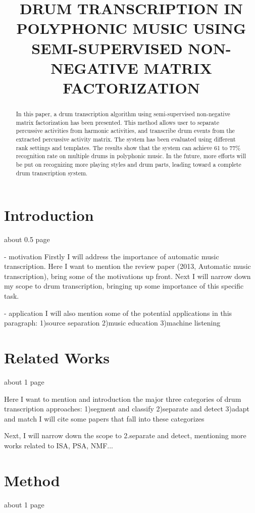 \documentclass{article}
\title{DRUM TRANSCRIPTION IN POLYPHONIC MUSIC USING SEMI-SUPERVISED NON-NEGATIVE MATRIX FACTORIZATION}
\begin{document}
%
\maketitle
%
\begin{abstract}
In this paper, a drum transcription algorithm using semi-supervised non-negative matrix factorization has been presented. This method allows user to separate percussive activities from harmonic activities, and transcribe drum events from the extracted percussive activity matrix. The system has been evaluated using different rank settings and templates. The results show that the system can achieve 61 to 77\% recognition rate on multiple drums in polyphonic music. In the future, more efforts will be put on recognizing more playing styles and drum parts, leading toward a complete drum transcription system.


\end{abstract}
%
\section{Introduction}\label{sec:introduction}
about 0.5 page

- motivation
Firstly I will address the importance of automatic music transcription. Here I want to mention the review paper (2013, Automatic music transcription), bring some of the motivations up front. Next I will narrow down my scope to drum transcription, bringing up some importance of this specific task.  

- application
I will also mention some of the potential applications in this paragraph:
1)source separation 
2)music education 
3)machine listening

\section{Related Works}\label{sec:related works}
about 1 page

Here I want to mention and introduction the major three categories of drum transcription approaches:
1)segment and classify
2)separate and detect
3)adapt and match
I will cite some papers that fall into these categorizes

Next, I will narrow down the scope to 2.separate and detect, mentioning more works related to ISA, PSA, NMF...

\section{Method}\label{sec:method}
about 1 page
\end{document}
